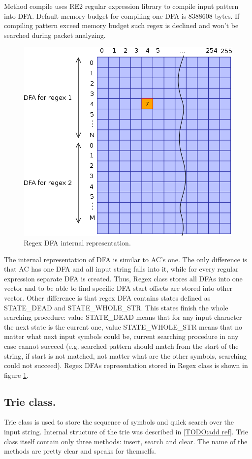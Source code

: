 \documentclass[thesis=M,english]{FITthesis}[2011/07/15]
\begin{document}
Method compile uses RE2 regular expression library to compile input pattern into DFA. Default memory budget for compiling one DFA is 8388608 bytes. If compiling pattern exceed memory budget such regex is declined and won't be searched during packet analyzing.

\begin{figure}[h]
\centering
\includegraphics[scale=0.5]{images/regex_grid.png}
\caption{Regex DFA internal representation.}
\label{fig:regex_grid}
\end{figure}

The internal representation of DFA is similar to AC's one. The only difference is that AC has one DFA and all input string falls into it, while for every regular expression separate DFA is created. Thus, Regex class stores all DFAs into one vector and to be able to find specific DFA start offsets are stored into other vector. Other difference is that regex DFA contains states defined as STATE\_DEAD and STATE\_WHOLE\_STR. This states finish the whole searching procedure: value STATE\_DEAD means that for any input character the next state is the current one, value STATE\_WHOLE\_STR means that no matter what next input symbols could be, current searching procedure in any case cannot succeed (e.g. searched pattern should match from the start of the string, if start is not matched, not matter what are the other symbols, searching could not succeed).
Regex DFAs representation stored in Regex class is shown in figure \ref{fig:regex_grid}.

\subsection{Trie class.}
Trie class is used to store the sequence of symbols and quick search over the input string. Internal structure of the trie was described in \ref{TODO:add ref}. Trie class itself contain only three methods: insert, search and clear. The name of the methods are pretty clear and speaks for themselfs.
\end{document}
